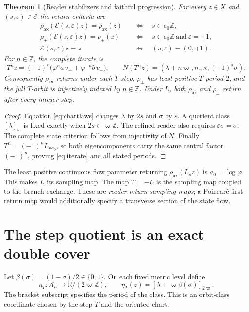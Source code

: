 \documentclass[10pt,letterpaper]{article}
\newtheorem{theorem}{Theorem}[section]
\theoremstyle{definition}\newtheorem{definition}[theorem]{Definition}
\newcommand{\RR}{\mathbb R}
\newcommand{\ZZ}{\mathbb Z}
\newcommand{\eps}{\varepsilon}
\newcommand{\aE}{\mathcal E}
\newcommand{\Ah}{\mathcal A_h}
\newcommand{\ph}{\varphi}
\newcommand{\varp}{\varpi}
\newcommand{\rhoax}{\rho_{\mathrm{ax}}}
\newcommand{\rhos}{\rho_{\pm}}
\newcommand{\etaT}{\eta_T}
\newcommand{\bb}[1]{\left[#1\right]}
\begin{document}
\begin{theorem}[Reader stabilizers and faithful progression]\label{thm:returns}
For every $z\in X$ and $(s,\eps)\in\aE$ the return criteria are
\begin{align}\label{eq:returns}
 \rhoax(\mathcal E(s,\eps)z)=\rhoax(z)
 &\quad\Longleftrightarrow\quad s\in a_0\ZZ,\\
 \rhos(\mathcal E(s,\eps)z)=\rhos(z)
 &\quad\Longleftrightarrow\quad s\in a_0\ZZ\ \text{and}\ \eps=+1,\\
 \mathcal E(s,\eps)z=z
 &\quad\Longleftrightarrow\quad(s,\eps)=(0,+1).\nonumber
\end{align}
For $n\in\ZZ$, the complete iterate is
\begin{equation}\label{eq:iterate}
 \boxed{\displaystyle
 T^nz=(-1)^n\bigl(\ph^n a\,v_++\ph^{-n}b\,v_-\bigr),\qquad
 N(T^nz)=(\lambda+n\varp,m,\kappa,(-1)^n\sigma).}
\end{equation}
Consequently $\rhoax$ returns under each $T$-step, $\rhos$ has least positive $T$-period $2$, and the full $T$-orbit is injectively indexed by $n\in\ZZ$. Under $L$, both $\rhoax$ and $\rhos$ return after every integer step.
\end{theorem}
\begin{proof}
Equation \eqref{eq:chartlaws} changes $\lambda$ by $2s$ and $\sigma$ by $\eps$. A quotient class $[\lambda]_{\varp}$ is fixed exactly when $2s\in\varp\ZZ$. The refined reader also requires $\eps\sigma=\sigma$. The complete state criterion follows from injectivity of $N$. Finally $T^n=(-1)^nL_{na_0}$, so both eigencomponents carry the same central factor $(-1)^n$, proving \eqref{eq:iterate} and all stated periods.
\end{proof}

The least positive continuous flow parameter returning $\rhoax(L_sz)$ is $a_0=\log\ph$. This makes $L$ its sampling map. The map $T=-L$ is the sampling map coupled to the branch exchange. These are \emph{reader-return sampling maps}; a Poincar\'e first-return map would additionally specify a transverse section of the state flow.

\section{The step quotient is an exact double cover}\label{sec:cover}
Let $\beta(\sigma)=(1-\sigma)/2\in\{0,1\}$. On each fixed metric level define
\begin{equation}\label{eq:eta}
 \etaT:\Ah\longrightarrow\RR/(2\varp\ZZ),\qquad
 \etaT(z)=\bb{\lambda+\varp\beta(\sigma)}_{2\varp}.
\end{equation}
The bracket subscript specifies the period of the class. This is an orbit-class coordinate chosen by the step $T$ and the oriented chart.
\end{document}
